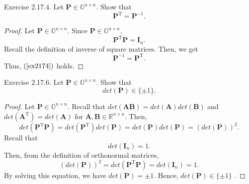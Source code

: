 \documentclass{article}
\theoremstyle{plain}
\begin{document}
\begin{itembox}[l]{Exercise 2.17.4.}
	Let
	\begin{math}
		\bm{P} \in \mathbb{O}^{n \times n} .
	\end{math}
	Show that
	\begin{equation}
		\label{ex2174}
		\bm{P}^{\mathrm{T}} = \bm{P}^{-1} .
	\end{equation}
\end{itembox}


\begin{proof}
	Let
	\begin{math}
		\bm{P} \in \mathbb{O}^{n \times n} .
	\end{math}
	Since
	\begin{math}
		\bm{P} \in \mathbb{O}^{n \times n},
	\end{math}
	\begin{equation*}
		\bm{P}^{\mathrm{T}} \bm{P} = \bm{I}_n .
	\end{equation*}
	Recall the definition of inverse of square matrices. Then, we get
	\begin{equation*}
		\bm{P}^{-1} = \bm{P}^{\mathrm{T}} .
	\end{equation*}
	Thus, $(\ref{ex2174})$ holds.
\end{proof}


\begin{itembox}[l]{Exercise 2.17.6.}
	Let
	\begin{math}
		\bm{P} \in \mathbb{O}^{ n \times n} .
	\end{math}
	Show that
	\begin{equation}
		\label{ex2176}
		det ({\bm{P}}) \in \{ \pm 1 \} .
	\end{equation}
\end{itembox}


\begin{proof}
	Let
	\begin{math}
		\bm{P} \in \mathbb{O}^{ n \times n} .
	\end{math}
	Recall that $det(\bm{AB}) = det(\bm{A}) det(\bm{B})$ and
	$det(\bm{A}^{\mathrm{T}}) = det(\bm{A})$ for $\bm{A} , \bm{B} \in \mathbb{R}^{n \times n}$.
	Then, 
	\begin{equation*}
		det(\bm{P}^{\mathrm{T}} \bm{P}) = det(\bm{P}^{\mathrm{T}}) det(\bm{P}) = det(\bm{P}) det(\bm{P}) = (det(\bm{P}))^2 .
	\end{equation*}
	Recall that
	\begin{equation*}
		det(\bm{I}_n) = 1 .
	\end{equation*}
	Then, from the definition of orthonormal matrices,
	\begin{equation*}
		(det(\bm{P}))^2 = det(\bm{P}^{\mathrm{T}} \bm{P}) = det(\bm{I}_n) = 1 .
	\end{equation*}
	By solving this equation, we have
	\begin{math}
		det(\bm{P}) = \pm 1 .
	\end{math}
	Hence, $det(\bm{P}) \in \{\pm 1\}$ .
\end{proof}
\end{document}
